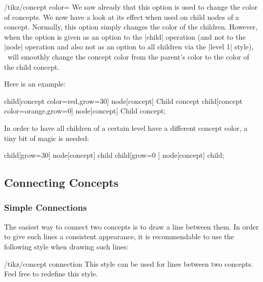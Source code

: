 \begin{key}{/tikz/concept color=}
  We saw already that this option is used to change the color of
  concepts. We now have a look at its effect when used on child nodes
  of a concept. Normally, this option simply changes the color of the
  children. However, when the option is given as an option to the
  |child| operation (and not to the |node| operation and also not as
  an option to all children via the |level 1| style), \tikzname\ will
  smoothly change the concept color from the parent's color to the
  color of the child concept. 

  Here is an example:
\begin{codeexample}[]
\tikz[mindmap,concept color=blue!80]
    child[concept color=red,grow=30] {node[concept] {Child concept}}
    child[concept color=orange,grow=0]  {node[concept] {Child concept}};
\end{codeexample}

  In order to have all children of a certain level have a different
  concept color, a tiny bit of magic is needed:
\begin{codeexample}[]
\tikz[mindmap,text=white,
      root concept/.style={concept color=blue},
      level 1 concept/.append style=
        {every child/.style={concept color=blue!50}}]
    child[grow=30] {node[concept] {child}}
    child[grow=0 ] {node[concept] {child}};
\end{codeexample}
\end{key}

\subsection{Connecting Concepts}

\subsubsection{Simple Connections}

The easiest way to connect two concepts is to draw a line between
them. In order to give such lines a consistent appearance, it is
recommendable to use the following style when drawing such lines:

\begin{stylekey}{/tikz/concept connection}
  This style can be used for lines between two concepts. Feel free to
  redefine this style.
\end{stylekey}

